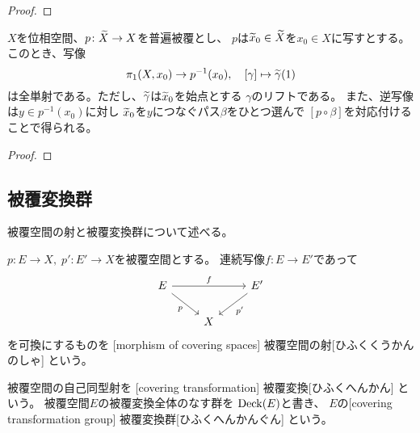 \documentclass[report]{jlreq}
\begin{document}
\begin{proof}
    \TODO{}
\end{proof}

\begin{proposition}[普遍被覆のファイバーと基本群]
    $X$を位相空間、$p \colon \widetilde{X} \to X$を普遍被覆とし、
    $p$は$\widetilde{x}_0 \in \widetilde{X}$を$x_0 \in X$に写すとする。
    このとき、写像
    \begin{equation}
        \pi_1(X, x_0) \to p^{-1}(x_0),
        \quad
        [\gamma] \mapsto \widetilde{\gamma}(1)
    \end{equation}
    は全単射である。ただし、$\widetilde{\gamma}$は$\widetilde{x}_0$を始点とする
    $\gamma$のリフトである。
    また、逆写像は$y \in p^{-1}(x_0)$に対し
    $\widetilde{x}_0$を$y$につなぐパス$\beta$をひとつ選んで
    $[p \circ \beta]$を対応付けることで得られる。
\end{proposition}

\begin{proof}
    \TODO{}
\end{proof}

\subsection{被覆変換群}

被覆空間の射と被覆変換群について述べる。

\begin{definition}[被覆空間の射]
    $p \colon E \to X, \; p' \colon E' \to X$を被覆空間とする。
    連続写像$f \colon E \to E'$であって
    \begin{equation}
        \begin{tikzcd}
            E \ar{rr}{f} \ar{rd}[swap]{p}
                && E' \ar{ld}{p'} \\
            & X
        \end{tikzcd}
    \end{equation}
    を可換にするものを
    [morphism of covering spaces]
        {被覆空間の射}[ひふくくうかんのしゃ]
    という。
\end{definition}

\begin{definition}[被覆変換群]
    被覆空間の自己同型射を
    [covering transformation]
        {被覆変換}[ひふくへんかん]
    という。
    被覆空間$E$の被覆変換全体のなす群を
    $\operatorname{Deck}(E)$と書き、
    $E$の[covering transformation group]
        {被覆変換群}[ひふくへんかんぐん]
    という。
\end{definition}
\end{document}
